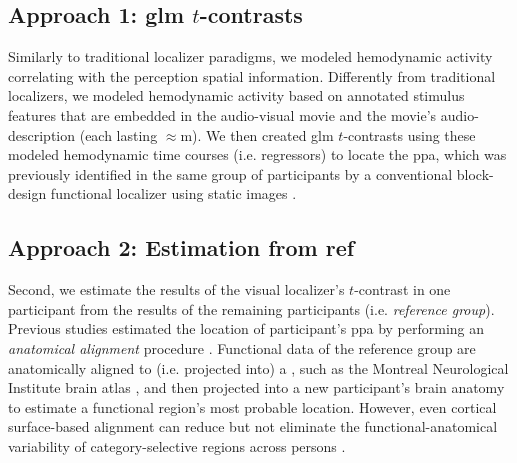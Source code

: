 \subsection{Approach 1: \ac{glm} $t$-contrasts}
%
Similarly to traditional localizer paradigms, we modeled hemodynamic activity
correlating with the perception spatial information.
Differently from traditional localizers, we modeled hemodynamic activity based
on annotated stimulus features that are embedded in the audio-visual movie and
the movie's audio-description (each lasting $\approx$\unit[120]{m}).
We then created \ac{glm} $t$-contrasts using these modeled hemodynamic time
courses (i.e. regressors) to locate the \ac{ppa}, which was previously
identified in the same group of participants by a conventional block-design
functional localizer using static images \citep{sengupta2016extension}.


\subsection{Approach 2: Estimation from ref}





Second, we estimate the results of the visual localizer's $t$-contrast in one
participant from the results of the remaining participants (i.e.
\textit{reference group}).
Previous studies estimated the location of participant's \ac{ppa} by performing
an \textit{anatomical alignment} procedure \citep{frost2012measuring,
rosenke2021probabilistic, weiner2018defining, zhen2017quantifying}.
%
Functional data of the reference group are anatomically aligned to (i.e.
projected into) a , such as the Montreal
Neurological Institute brain atlas \citep[MNI152 atlas;][]{fonov2011unbiased},
and then projected into a new participant's brain anatomy to estimate a
functional region's most probable location.
%
However, even cortical surface-based alignment \citep{fischl1999cortical,
yeo2009spherical} can reduce but not eliminate the functional-anatomical
variability of category-selective regions across persons
\citep{frost2012measuring, weiner2018defining, weiner2014mid}.



